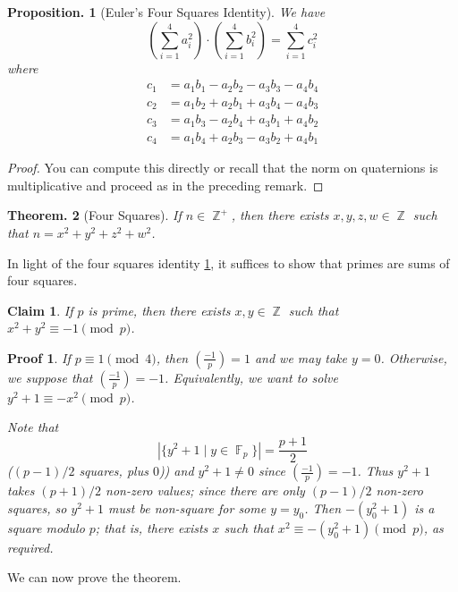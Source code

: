 \documentclass[11pt, a4paper]{memoir}
\DeclareMathOperator{\Z}{{\mathbb{Z}}}
\DeclareMathOperator{\F}{{\mathbb{F}}}
\theoremstyle{change}
\newtheorem{theorem}{Theorem.}[section]
\newtheorem{proposition}[theorem]{Proposition.}
\theoremstyle{plain}
\newtheorem{claim}{Claim}
\theoremstyle{nonumberplain}
\newtheorem{proof}{Proof}
\newtheorem{nmproof}{Proof}
\newcommand{\lgs}[2]{\ensuremath{\left(\frac{#1}{#2}\right)}}
\numberwithin{equation}{section}
\begin{document}
\begin{proposition}[Euler's Four Squares Identity]\label{p:efsi}
    We have
    \begin{equation*}
        \left(\sum_{i=1}^4 a_i^2\right)\cdot\left(\sum_{i=1}^4 b_i^2\right)=\sum_{i=1}^4 c_i^2
    \end{equation*}
    where
    \begin{align*}
        c_1 &= a_1b_1-a_2b_2-a_3b_3-a_4b_4\\
        c_2 &= a_1b_2+a_2b_1+a_3b_4-a_4b_3\\
        c_3 &= a_1b_3-a_2b_4+a_3b_1+a_4b_2\\
        c_4 &= a_1b_4+a_2b_3-a_3b_2+a_4b_1
    \end{align*}
\end{proposition}
\begin{proof}
    You can compute this directly or recall that the norm on quaternions is multiplicative and proceed as in the preceding remark.
\end{proof}
\begin{theorem}[Four Squares]
    If $n\in\Z^+$, then there exists $x,y,z,w\in\Z$ such that $n=x^2+y^2+z^2+w^2$.
\end{theorem}
In light of the four squares identity \cref{p:efsi}, it suffices to show that primes are sums of four squares.
\begin{claim}
    If $p$ is prime, then there exists $x,y\in\Z$ such that $x^2+y^2\equiv -1\pmod{p}$.
\end{claim}
\begin{nmproof}
    If $p\equiv 1\pmod{4}$, then $\lgs{-1}{p}=1$ and we may take $y=0$.
    Otherwise, we suppose that $\lgs{-1}{p}=-1$.
    Equivalently, we want to solve $y^2+1\equiv -x^2\pmod{p}$.

    Note that
    \begin{equation*}
        |\{y^2+1\mid y\in\F_p\}|=\frac{p+1}{2}
    \end{equation*}
    ($(p-1)/2$ squares, plus $0$))
    and $y^2+1\neq 0$ since $\lgs{-1}{p}=-1$.
    Thus $y^2+1$ takes $(p+1)/2$ non-zero values; since there are only $(p-1)/2$ non-zero squares, so $y^2+1$ must be non-square for some $y=y_0$.
    Then $-(y_0^2+1)$ is a square modulo $p$; that is, there exists $x$ such that $x^2\equiv-(y_0^2+1)\pmod{p}$, as required.
\end{nmproof}
We can now prove the theorem.
\end{document}
